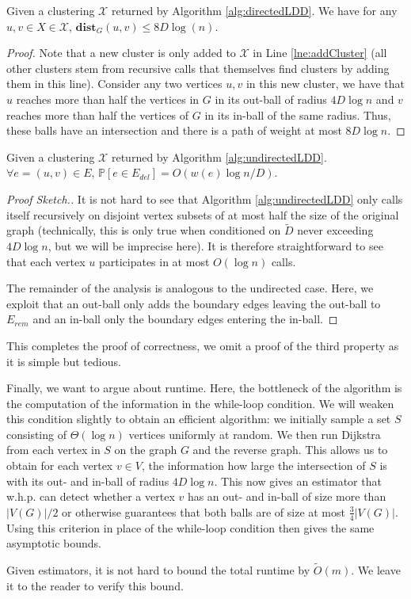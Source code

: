 \begin{claim}
Given a clustering $\mathcal{X}$ returned by Algorithm \ref{alg:directedLDD}. We have for any $u,v \in X \in \mathcal{X}$, $\mathbf{dist}_{G}(u,v) \leq 8 D \log(n)$. 
\end{claim}
\begin{proof}
Note that a new cluster is only added to $\mathcal{X}$ in Line \ref{lne:addCluster} (all other clusters stem from recursive calls that themselves find clusters by adding them in this line). Consider any two vertices $u,v$ in this new cluster, we have that $u$ reaches more than half the vertices in $G$ in its out-ball of radius $4D \log n$ and $v$ reaches more than half the vertices of $G$ in its in-ball of the same radius. Thus, these balls have an intersection and there is a path of weight at most $8D \log n$. 
\end{proof}

\begin{claim}
Given a clustering $\mathcal{X}$ returned by Algorithm \ref{alg:undirectedLDD}. $\forall e = (u,v) \in E$, $\mathbb{P}[e \in E_{del}] = O(w(e) \log n / D)$.
\end{claim}
\begin{proof}[Proof Sketch.]
It is not hard to see that  Algorithm \ref{alg:undirectedLDD} only calls itself recursively on disjoint vertex subsets of at most half the size of the original graph (technically, this is only true when conditioned on $\tilde{D}$ never exceeding $4D \log n$, but we will be imprecise here). It is therefore straightforward to see that each vertex $u$ participates in at most $O(\log n)$ calls. 

The remainder of the analysis is analogous to the undirected case. Here, we exploit that an out-ball only adds the boundary edges leaving the out-ball to $E_{rem}$ and an in-ball only the boundary edges entering the in-ball. 
\end{proof}

This completes the proof of correctness, we omit a proof of the third property as it is simple but tedious.

Finally, we want to argue about runtime. Here, the bottleneck of the algorithm is the computation of the information in the while-loop condition. We will weaken this condition slightly to obtain an efficient algorithm: we initially sample a set $S$ consisting of $\Theta(\log n)$ vertices uniformly at random. We then run Dijkstra from each vertex in $S$ on the graph $G$ and the reverse graph. This allows us to obtain for each vertex $v \in V$, the information how large the intersection of $S$ is with its out- and in-ball of radius $4D\log n$. This now gives an estimator that w.h.p. can detect whether a vertex $v$ has an out- and in-ball of size more than $|V(G)|/2$ or otherwise guarantees that both balls are of size at most $\frac{3}{4}|V(G)|$. Using this criterion in place of the while-loop condition then gives the same asymptotic bounds.

Given estimators, it is not hard to bound the total runtime by $\tilde{O}(m)$. We leave it to the reader to verify this bound.